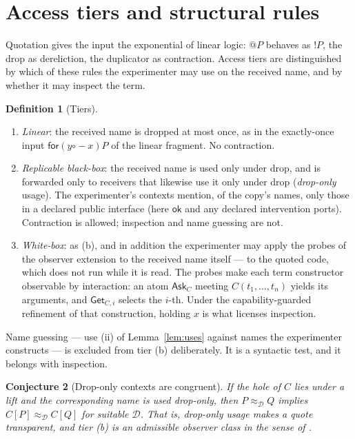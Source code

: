 \documentclass[11pt]{article}
\makeatletter
\theoremstyle{definition}
\newtheorem{definition}{Definition}[section]
\theoremstyle{plain}
\newtheorem{conjecture}[definition]{Conjecture}
\theoremstyle{remark}
\newcommand{\quo}[1]{@#1}
\newcommand{\Obs}{\mathcal{D}}
\newcommand{\bisim}{\approx}
\newcommand{\ok}{\mathsf{ok}}
\makeatother
\begin{document}
\section{Access tiers and structural rules}\label{sec:tiers}

Quotation gives the input the exponential of linear logic: $\quo{P}$
behaves as $!P$, the drop as dereliction, the duplicator as contraction.
Access tiers are distinguished by which of these rules the experimenter
may use on the received name, and by whether it may inspect the term.

\begin{definition}[Tiers]\label{def:tiers}
\begin{enumerate}[label=(\alph*),leftmargin=2.2em]
\item \emph{Linear}: the received name is dropped at most once, as in the
exactly-once input $\mathsf{for}(y \mathrel{\circ\!\!-} x)P$ of the
linear fragment. No contraction.

\item \emph{Replicable black-box}: the received name is used only under
drop, and is forwarded only to receivers that likewise use it only under
drop (\emph{drop-only} usage). The experimenter's contexts mention, of
the copy's names, only those in a declared public interface (here $\ok$
and any declared intervention ports). Contraction is allowed; inspection
and name guessing are not.

\item \emph{White-box}: as (b), and in addition the experimenter may apply
the probes of the observer extension \cite{ObserverExt} to the received
name itself --- to the quoted code, which does not run while it is read.
The probes make each term constructor observable by interaction: an atom $\mathsf{Ask}_C$ meeting $C(t_1,\dots,t_n)$
yields its arguments, and $\mathsf{Get}_{C,i}$ selects the $i$-th. Under
the capability-guarded refinement of that construction, holding $x$ is
what licenses inspection.
\end{enumerate}
\end{definition}

Name guessing --- use (ii) of Lemma~\ref{lem:uses} against names the
experimenter constructs --- is excluded from tier (b) deliberately. It is
a syntactic test, and it belongs with inspection.

\begin{conjecture}[Drop-only contexts are congruent]\label{conj:dropOnly}
If the hole of $C$ lies under a lift and the corresponding name is used
drop-only, then $P \bisim_\Obs Q$ implies $C[P] \bisim_\Obs C[Q]$ for
suitable $\Obs$. That is, drop-only usage makes a quote transparent, and
tier (b) is an admissible observer class in the sense of \cite{BIHOL}.
\end{conjecture}
\end{document}
